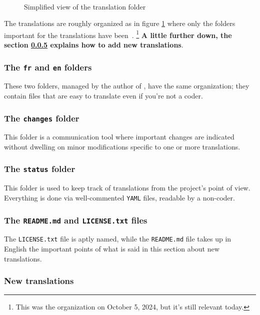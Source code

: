 \begin{figure}[ht]
    \centering
    \contribtranslatedirtree\
    \caption{Simplified view of the translation folder}
    \label{tutodoc-contrib-translate-dir}
\end{figure}


The translations are roughly organized as in figure \ref{tutodoc-contrib-translate-dir} where only the folders important for the translations have been \,.%
\footnote{
    This was the organization on October 5, 2024, but it's still relevant today.
}
\textbf{A little further down, the section \ref{tutodoc-contrib-translate} explains how to add new translations}.


\subsubsection{The \texttt{fr} and \texttt{en} folders}

These two folders, managed by the author of \thisproj, have the same organization; they contain files that are easy to translate even if you're not a coder.


\subsubsection{The \texttt{changes} folder}

This folder is a communication tool where important changes are indicated without dwelling on minor modifications specific to one or more translations.


\subsubsection{The \texttt{status} folder}

This folder is used to keep track of translations from the project's point of view. Everything is done via well-commented \verb#YAML# files, readable by a non-coder.


\subsubsection{The \texttt{README.md} and \texttt{LICENSE.txt} files}

The \texttt{LICENSE.txt} file is aptly named, while the \texttt{README.md} file takes up in English the important points of what is said in this section about new translations.


\subsubsection{New translations}
\label{tutodoc-contrib-translate}

